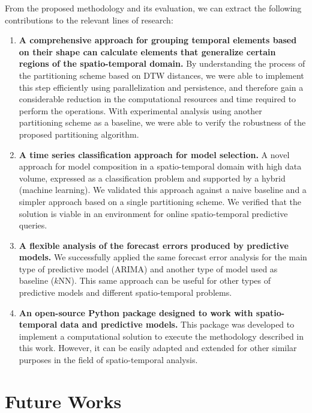 From the proposed methodology and its evaluation, we can extract the following contributions to the relevant lines of research:

\begin{enumerate}

\item \textbf{A comprehensive approach for grouping temporal elements based on their shape can calculate elements that generalize certain regions of the spatio-temporal domain.} By understanding the process of the partitioning scheme based on DTW distances, we were able to implement this step efficiently using parallelization and persistence, and therefore gain a considerable reduction in the computational resources and time required to perform the operations. With experimental analysis using another partitioning scheme as a baseline, we were able to verify the robustness of the proposed partitioning algorithm.

\item \textbf{A time series classification approach for model selection.} A novel approach for model composition in a spatio-temporal domain with high data volume, expressed as a classification problem and supported by a hybrid (machine learning). We validated this approach against a naive baseline and a simpler approach based on a single partitioning scheme. We verified that the solution is viable in an environment for online spatio-temporal predictive queries.

\item \textbf{A flexible analysis of the forecast errors produced by predictive models.} We successfully applied the same forecast error analysis for the main type of predictive model (ARIMA) and another type of model used as baseline ($k$NN). This same approach can be useful for other types of predictive models and different spatio-temporal problems.

\item \textbf{An open-source Python package designed to work with spatio-temporal data and predictive models.} This package was developed to implement a computational solution to execute the methodology described in this work. However, it can be easily adapted and extended for other similar purposes in the field of spatio-temporal analysis.
\end{enumerate}

\section{Future Works}

